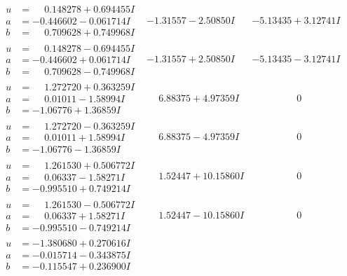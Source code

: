 \documentclass[1p]{elsarticle_modified}
\theoremstyle{definition}
\begin{document}
$$\begin{array}{c|c|c}
\begin{aligned}
u &= \phantom{-}0.148278 + 0.694455 I \\
a &= -0.446602 - 0.061714 I \\
b &= \phantom{-}0.709628 + 0.749968 I\end{aligned}
 & -1.31557 - 2.50850 I & -5.13435 + 3.12741 I \\ \hline\begin{aligned}
u &= \phantom{-}0.148278 - 0.694455 I \\
a &= -0.446602 + 0.061714 I \\
b &= \phantom{-}0.709628 - 0.749968 I\end{aligned}
 & -1.31557 + 2.50850 I & -5.13435 - 3.12741 I \\ \hline\begin{aligned}
u &= \phantom{-}1.272720 + 0.363259 I \\
a &= \phantom{-}0.01011 - 1.58994 I \\
b &= -1.06776 + 1.36859 I\end{aligned}
 & \phantom{-}6.88375 + 4.97359 I & \phantom{-0.000000 } 0 \\ \hline\begin{aligned}
u &= \phantom{-}1.272720 - 0.363259 I \\
a &= \phantom{-}0.01011 + 1.58994 I \\
b &= -1.06776 - 1.36859 I\end{aligned}
 & \phantom{-}6.88375 - 4.97359 I & \phantom{-0.000000 } 0 \\ \hline\begin{aligned}
u &= \phantom{-}1.261530 + 0.506772 I \\
a &= \phantom{-}0.06337 - 1.58271 I \\
b &= -0.995510 + 0.749214 I\end{aligned}
 & \phantom{-}1.52447 + 10.15860 I & \phantom{-0.000000 } 0 \\ \hline\begin{aligned}
u &= \phantom{-}1.261530 - 0.506772 I \\
a &= \phantom{-}0.06337 + 1.58271 I \\
b &= -0.995510 - 0.749214 I\end{aligned}
 & \phantom{-}1.52447 - 10.15860 I & \phantom{-0.000000 } 0 \\ \hline\begin{aligned}
u &= -1.380680 + 0.270616 I \\
a &= -0.015714 - 0.343875 I \\
b &= -0.115547 + 0.236900 I\end{aligned}

\end{array}$$
\end{document}
